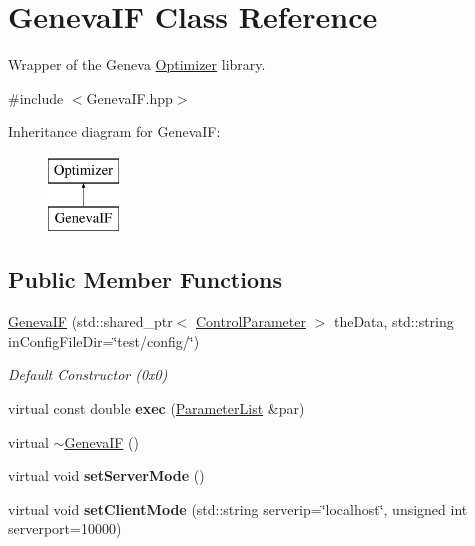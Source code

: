 \hypertarget{class_geneva_i_f}{\section{Geneva\-I\-F Class Reference}
\label{class_geneva_i_f}
}


Wrapper of the Geneva \hyperlink{class_optimizer}{Optimizer} library.  




{\ttfamily \#include $<$Geneva\-I\-F.\-hpp$>$}

Inheritance diagram for Geneva\-I\-F\-:\begin{figure}[H]
\begin{center}
\leavevmode
\includegraphics[height=2.000000cm]{class_geneva_i_f}
\end{center}
\end{figure}
\subsection*{Public Member Functions}
\begin{DoxyCompactItemize}
\item 
\hypertarget{class_geneva_i_f_a2ab9fc95b61a5f21856245ca9de7c51d}{\hyperlink{class_geneva_i_f_a2ab9fc95b61a5f21856245ca9de7c51d}{Geneva\-I\-F} (std\-::shared\-\_\-ptr$<$ \hyperlink{class_control_parameter}{Control\-Parameter} $>$ the\-Data, std\-::string in\-Config\-File\-Dir=\char`\"{}test/config/\char`\"{})}\label{class_geneva_i_f_a2ab9fc95b61a5f21856245ca9de7c51d}

\begin{DoxyCompactList}\small\item\em Default Constructor (0x0) \end{DoxyCompactList}\item 
\hypertarget{class_geneva_i_f_a2f4ed9d5cf44575da316c6f52e863315}{virtual const double {\bfseries exec} (\hyperlink{class_parameter_list}{Parameter\-List} \&par)}\label{class_geneva_i_f_a2f4ed9d5cf44575da316c6f52e863315}

\item 
virtual \hyperlink{class_geneva_i_f_ac1dcb675cdeceae9335157f1c2560fe9}{$\sim$\-Geneva\-I\-F} ()
\item 
\hypertarget{class_geneva_i_f_a5c98aa241df27f176203d5f585b1c47c}{virtual void {\bfseries set\-Server\-Mode} ()}\label{class_geneva_i_f_a5c98aa241df27f176203d5f585b1c47c}

\item 
\hypertarget{class_geneva_i_f_ab23559f5d3482d0e281f1ecf0848b5bb}{virtual void {\bfseries set\-Client\-Mode} (std\-::string serverip=\char`\"{}localhost\char`\"{}, unsigned int serverport=10000)}\label{class_geneva_i_f_ab23559f5d3482d0e281f1ecf0848b5bb}

\end{DoxyCompactItemize}



